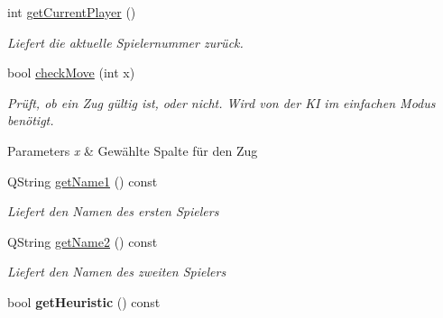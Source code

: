 \begin{DoxyCompactItemize}
\item 
int \hyperlink{class_connect_four_a9b4b647139235c7c3eae2c5c9c8d7471}{get\-Current\-Player} ()
\begin{DoxyCompactList}\small\item\em Liefert die aktuelle Spielernummer zurück. \end{DoxyCompactList}\item 
bool \hyperlink{class_connect_four_ad00b3add13aac59b6dc6469cb24c7d53}{check\-Move} (int x)
\begin{DoxyCompactList}\small\item\em Prüft, ob ein Zug gültig ist, oder nicht. Wird von der K\-I im einfachen Modus benötigt. 
\begin{DoxyParams}{Parameters}
{\em x} & Gewählte Spalte für den Zug\\
\hline
\end{DoxyParams}
\end{DoxyCompactList}\item 
Q\-String \hyperlink{class_connect_four_a0fb31ff9df21241727dc89111a8237d1}{get\-Name1} () const 
\begin{DoxyCompactList}\small\item\em Liefert den Namen des ersten Spielers \end{DoxyCompactList}\item 
Q\-String \hyperlink{class_connect_four_af1e622aabf4ab9c3e59f120453b4b00a}{get\-Name2} () const 
\begin{DoxyCompactList}\small\item\em Liefert den Namen des zweiten Spielers \end{DoxyCompactList}\item 
\hypertarget{class_connect_four_a1ee5735fdac151d7f11fec3daeeef6fc}{bool {\bfseries get\-Heuristic} () const }\label{class_connect_four_a1ee5735fdac151d7f11fec3daeeef6fc}


\end{DoxyCompactItemize}
